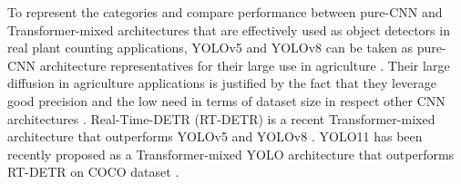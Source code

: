 \documentclass[journal,article,submit,pdftex,moreauthors]{Definitions/mdpi}
\begin{document}
To represent the categories and compare performance between pure-CNN and Transformer-mixed architectures
that are effectively used as object detectors in real plant counting applications,
YOLOv5 and YOLOv8 can be taken as pure-CNN architecture representatives for their 
large use in agriculture \cite{badgujarAgriculturalObjectDetection2024}.
Their large diffusion in agriculture applications is justified by the fact that they leverage good precision
and the low need in terms of dataset size in respect other CNN architectures \cite{tanEfficientDetScalableEfficient2020,linFocalLossDense2018,zhangComparisonYOLObasedSorghum2025}.
Real-Time-DETR (RT-DETR) is a recent Transformer-mixed architecture that outperforms
YOLOv5 and YOLOv8 \cite{zhaoDETRsBeatYOLOs2024}. 
YOLO11 has been recently proposed as a
Transformer-mixed YOLO architecture that outperforms RT-DETR on COCO dataset \cite{khanamYOLOv11OverviewKey2024}.
\end{document}
